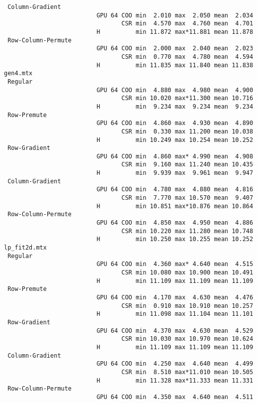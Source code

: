 {\begin{verbatim}
 Column-Gradient
                          GPU 64 COO min  2.010 max  2.050 mean  2.034
                                 CSR min  4.570 max  4.760 mean  4.701
                          H          min 11.872 max*11.881 mean 11.878
 Row-Column-Permute
                          GPU 64 COO min  2.000 max  2.040 mean  2.023
                                 CSR min  0.770 max  4.780 mean  4.594
                          H          min 11.835 max 11.840 mean 11.838
gen4.mtx
 Regular
                          GPU 64 COO min  4.880 max  4.980 mean  4.900
                                 CSR min 10.020 max*11.300 mean 10.716
                          H          min  9.234 max  9.234 mean  9.234
 Row-Premute
                          GPU 64 COO min  4.860 max  4.930 mean  4.890
                                 CSR min  0.330 max 11.200 mean 10.038
                          H          min 10.249 max 10.254 mean 10.252
 Row-Gradient
                          GPU 64 COO min  4.860 max* 4.990 mean  4.908
                                 CSR min  9.160 max 11.240 mean 10.435
                          H          min  9.939 max  9.961 mean  9.947
 Column-Gradient
                          GPU 64 COO min  4.780 max  4.880 mean  4.816
                                 CSR min  7.770 max 10.570 mean  9.407
                          H          min 10.851 max*10.876 mean 10.864
 Row-Column-Permute
                          GPU 64 COO min  4.850 max  4.950 mean  4.886
                                 CSR min 10.220 max 11.280 mean 10.748
                          H          min 10.250 max 10.255 mean 10.252
lp_fit2d.mtx
 Regular
                          GPU 64 COO min  4.360 max* 4.640 mean  4.515
                                 CSR min 10.080 max 10.900 mean 10.491
                          H          min 11.109 max 11.109 mean 11.109
 Row-Premute
                          GPU 64 COO min  4.170 max  4.630 mean  4.476
                                 CSR min  0.910 max 10.910 mean 10.257
                          H          min 11.098 max 11.104 mean 11.101
 Row-Gradient
                          GPU 64 COO min  4.370 max  4.630 mean  4.529
                                 CSR min 10.030 max 10.970 mean 10.624
                          H          min 11.109 max 11.109 mean 11.109
 Column-Gradient
                          GPU 64 COO min  4.250 max  4.640 mean  4.499
                                 CSR min  8.510 max*11.010 mean 10.505
                          H          min 11.328 max*11.333 mean 11.331
 Row-Column-Permute
                          GPU 64 COO min  4.350 max  4.640 mean  4.511

\end{verbatim}}

